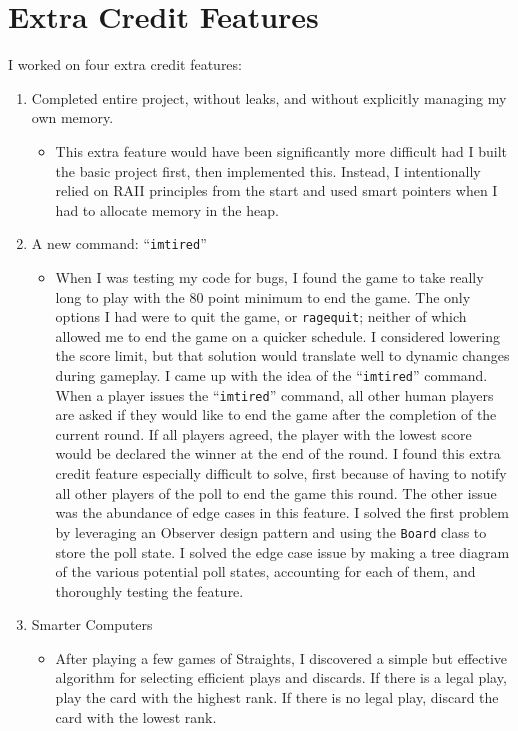 \documentclass[12pt]{article}
\begin{document}
	\section{Extra Credit Features}
		I worked on four extra credit features:
		\begin{enumerate}
			\item Completed entire project, without leaks, and without explicitly managing my own memory.
				\begin{itemize}
					\item This extra feature would have been significantly more difficult had I built the basic project first, then implemented this. Instead, I intentionally relied on RAII principles from the start and used smart pointers when I had to allocate memory in the heap.
				\end{itemize}
			\item A new command: ``\texttt{imtired}''
				\begin{itemize}
					\item When I was testing my code for bugs, I found the game to take really long to play with the 80 point minimum to end the game. The only options I had were to quit the game, or \texttt{ragequit}; neither of which allowed me to end the game on a quicker schedule. I considered lowering the score limit, but that solution would translate well to dynamic changes during gameplay.
						I came up with the idea of the ``\texttt{imtired}'' command. When a player issues the ``\texttt{imtired}'' command, all other human players are asked if they would like to end the game after the completion of the current round. If all players agreed, the player with the lowest score would be declared the winner at the end of the round.
						I found this extra credit feature especially difficult to solve, first because of having to notify all other players of the poll to end the game this round. The other issue was the abundance of edge cases in this feature.
						I solved the first problem by leveraging an Observer design pattern and using the \texttt{Board} class to store the poll state. I solved the edge case issue by making a tree diagram of the various potential poll states, accounting for each of them, and thoroughly testing the feature.
				\end{itemize}
			\item Smarter Computers
				\begin{itemize}
					\item After playing a few games of Straights, I discovered a simple but effective algorithm for selecting efficient plays and discards. If there is a legal play, play the card with the highest rank. If there is no legal play, discard the card with the lowest rank.

\end{itemize}
\end{enumerate}
\end{document}
